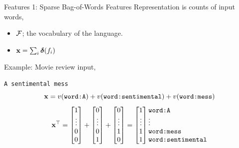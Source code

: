 \documentclass{beamer}
\begin{document}
\begin{frame}{Features 1: Sparse Bag-of-Words Features}
  Representation is counts of input words, 
  \begin{itemize}
  \item $\mathcal{F}$; the vocabulary of the language.
  \item $\mathbf{x} = \sum_{i} \boldsymbol{\delta}(f_i)$ 
  \end{itemize}

  Example: Movie review input, 
  \begin{center}
    \texttt{A sentimental mess}
    \[ \mathbf{x} = v(\texttt{word:A}) + v(\texttt{word:sentimental}) +
    v(\texttt{word:mess}) \] 
    \[ \boldx^\top =\begin{bmatrix} 1 \\ \vdots
        \\ 0\\ 0 \\ \end{bmatrix} +\begin{bmatrix} 0 \\
        \vdots \\ 0\\ 1 \\ \end{bmatrix} +
     \begin{bmatrix} 0 \\ \vdots \\ 1\\ 0 \\ \end{bmatrix} 
    =\begin{bmatrix} 1 \\ \vdots \\ 1 \\ 1 \\ \end{bmatrix} 
    \begin{matrix*}[l] \mathrm{\texttt{word:A}} \\ \vdots \\ \mathrm{\texttt{word:mess}} \\ \mathrm{\texttt{word:sentimental}} \\ \end{matrix*}
     \]
  \end{center}
\end{frame}
\end{document}
